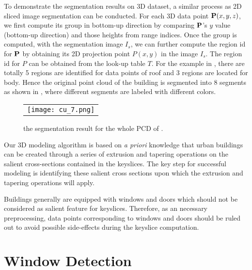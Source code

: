 To demonstrate the segmentation results on 3D dataset,
a similar process as 2D sliced image segmentation can be conducted.
For each 3D data point ${\bf P}(x, y, z)$, 
we first compute its group in bottom-up direction
by comparing ${\bf P}$'s $y$ value (bottom-up direction) and 
those heights from range indices.
%
Once the group is computed, with the segmentation image $I_s$, 
we can further compute the region id for ${\bf P}$ by
obtaining its 2D projection point $P(x, y)$ in the image $I_s$. 
The region id for $P$ can be obtained from the look-up table $T$.
For the example in ,
there are totally 5 regions are identified for data points of roof
and 3 regions are located for body.
Hence the original point cloud of the building is 
segmented into 8 segments as shown in ,
where different segments are labeled with different colors.

\begin{figure} [htbp]
\begin{center}
\begin{tabular}{c}
\texttt{[image: cu\_7.png]} 
\end{tabular}
\end{center}
\caption{ the segmentation result for the whole PCD of .}
\label{fig:DS_Fig2}
\end{figure}



\label{sec:reconst}
Our 3D modeling algorithm is based on \emph{a priori} knowledge that
urban buildings can be created through a series of extrusion and tapering
operations on the salient cross-sections contained in the keyslices.
The key step for successful modeling is identifying these salient cross
sections upon which the extrusion and tapering operations will apply.

Buildings generally are equipped with windows and doors which should not
be considered as salient feature for keyslices. 
Therefore, as an necessary preprocessing, 
data points corresponding to windows and doors
should be ruled out to avoid possible side-effects
during the keyslice computation.

\section{Window Detection}
\label{sec:wdd}

